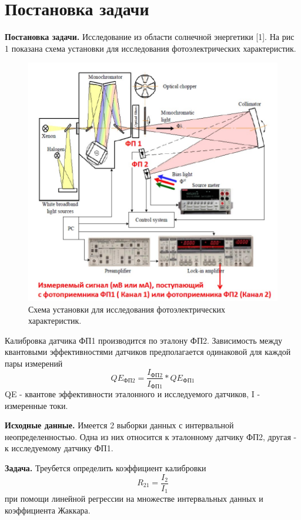 \documentclass[a4paper,14pt]{article}
\begin{document}
	\section{Постановка задачи}
	\textbf{Постановка задачи.}
	Исследование из области солнечной энергетики [1]. На рис 1 показана схема установки для исследования фотоэлектрических характеристик.
	\begin{figure}[H]
		\centering
		\includegraphics{../image/task.jpg}
		\caption{Схема установки для исследования фотоэлектрических характеристик.}
		\label{w_pert}
	\end{figure}
	
	Калибровка датчика ФП1 производится по эталону ФП2. Зависимость между квантовыми эффективностями датчиков предполагается одинаковой для каждой пары измерений
	\begin{equation}
		QE_{ФП2} = \frac{I_{ФП2}}{I_{ФП1}}*QE_{ФП1} 
		\label{T}
	\end{equation}
	QE - квантове эффективности эталонного и исследуемого датчиков, I - измеренные токи.
	
	\textbf{Исходные данные.}
	Имеется 2 выборки данных с интервальной неопределенностью. Одна из них относится к эталонному датчику ФП2, другая - к исследуемому датчику ФП1.
	
	\textbf{Задача.}
	Треубется определить коэффициент калибровки
	\begin{equation}
		R_{21} = \frac{I_{2}}{I_{1}}
		\label{T}
	\end{equation}
	при помощи линейной регрессии на множестве интервальных данных и коэффициента Жаккара.
	\newpage
\end{document}
